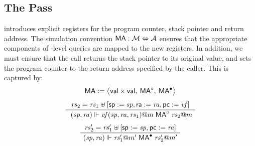 \documentclass[sigplan,screen]{acmart}
\newenvironment{optional}{}{}
\begin{document}
\begin{optional}

\subsection{The  Pass} \label{sec:asmgen} %

 introduces explicit registers for the
program counter, stack pointer and return address.
The simulation convention
${  \mathsf{MA}  } : \mathcal{M} \Leftrightarrow \mathcal{A}$
ensures that the appropriate components of
-level queries are mapped to the new registers.
In addition,
we must ensure that the call returns the stack pointer
to its original value,
and sets the program counter to the return address
specified by the caller.
%
%
This is captured by:
\begin{gather*}
  \cc{M}{A} := \big\langle \kw{val} \times \kw{val}, \:
    \cc{M}{A}^\que, \: \cc{M}{A}^\ans \big\rangle
  \\[1ex]
  \AxiomC{$\mathit{rs}_2 = \mathit{rs}_1 \uplus
    [\kw{sp} := \mathit{sp}, \kw{ra} := \mathit{ra}, \kw{pc} := \mathit{vf}]$}
  \UnaryInfC{
    $(\mathit{sp}, \mathit{ra}) \Vdash
     \mathit{vf}(\mathit{sp}, \mathit{ra}, \mathit{rs}_1)@m
     \mathrel{\cc{M}{A}^\que}
     \mathit{rs}_2@m$}
  \DisplayProof
  \\[1ex]
  \AxiomC{$
    \mathit{rs}_2' =
    \mathit{rs}_1' \uplus [\kw{sp} := \mathit{sp}, \kw{pc} := \mathit{ra}]$}
  \UnaryInfC{$
    (\mathit{sp}, \mathit{ra}) \Vdash \mathit{rs}_1'@m'
    \mathrel{\cc{M}{A}^\ans}
    \mathit{rs}_2'@m'$}
  \DisplayProof
\end{gather*}



\end{optional}
\end{document}
